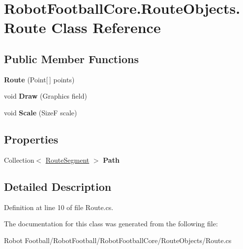 \hypertarget{class_robot_football_core_1_1_route_objects_1_1_route}{\section{Robot\-Football\-Core.\-Route\-Objects.\-Route Class Reference}
\label{class_robot_football_core_1_1_route_objects_1_1_route}
}
\subsection*{Public Member Functions}
\begin{DoxyCompactItemize}
\item 
\hypertarget{class_robot_football_core_1_1_route_objects_1_1_route_a475a18f82ff8be053038bee9dfcda89a}{{\bfseries Route} (Point\mbox{[}$\,$\mbox{]} points)}\label{class_robot_football_core_1_1_route_objects_1_1_route_a475a18f82ff8be053038bee9dfcda89a}

\item 
\hypertarget{class_robot_football_core_1_1_route_objects_1_1_route_a54ccf294a709c3081c853cf0354b452c}{void {\bfseries Draw} (Graphics field)}\label{class_robot_football_core_1_1_route_objects_1_1_route_a54ccf294a709c3081c853cf0354b452c}

\item 
\hypertarget{class_robot_football_core_1_1_route_objects_1_1_route_ae566de1b8855245c8ff98bd2c766792b}{void {\bfseries Scale} (Size\-F scale)}\label{class_robot_football_core_1_1_route_objects_1_1_route_ae566de1b8855245c8ff98bd2c766792b}

\end{DoxyCompactItemize}
\subsection*{Properties}
\begin{DoxyCompactItemize}
\item 
\hypertarget{class_robot_football_core_1_1_route_objects_1_1_route_a55c2b2d86a8dc6b3876c36292726808b}{Collection$<$ \hyperlink{class_robot_football_core_1_1_route_objects_1_1_route_segment}{Route\-Segment} $>$ {\bfseries Path}}\label{class_robot_football_core_1_1_route_objects_1_1_route_a55c2b2d86a8dc6b3876c36292726808b}

\end{DoxyCompactItemize}


\subsection{Detailed Description}


Definition at line 10 of file Route.\-cs.



The documentation for this class was generated from the following file\-:\begin{DoxyCompactItemize}
\item 
Robot Football/\-Robot\-Football/\-Robot\-Football\-Core/\-Route\-Objects/Route.\-cs\end{DoxyCompactItemize}
